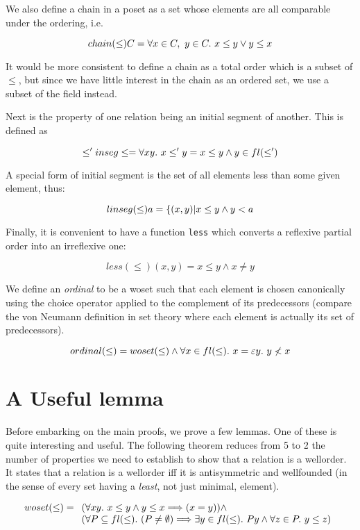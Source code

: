 We also define a chain in a poset as a set whose elements are all comparable
under the ordering, i.e.

$$ chain(\leq) C = \forall x \in C,\ y \in C.\ x \leq y \vee y \leq x $$

It would be more consistent to define a chain as a total order which is a
subset of $\leq$, but since we have little interest in the chain as an ordered
set, we use a subset of the field instead.

Next is the property of one relation being an initial segment of another. This
is defined as

$$ \leq' inseg \leq =
   \forall x y.\ x \leq' y = x \leq y \wedge y \in fl(\leq') $$

A special form of initial segment is the set of all elements less than some
given element, thus:

$$ linseg(\leq) a = \{ (x,y) | x \leq y \wedge y < a $$

Finally, it is convenient to have a function {\tt less} which converts a
reflexive partial order into an irreflexive one:

$$ less(\leq)(x,y) = x \leq y \wedge x \not= y $$

We define an {\em ordinal} to be a woset such that each element is chosen
canonically using the choice operator applied to the complement of its
predecessors (compare the von Neumann definition in set theory where each
element is actually its set of predecessors).

$$ ordinal(\leq) = woset(\leq) \wedge
                   \forall x \in fl(\leq).\ x = \varepsilon y.\ y \not < x $$


\section{A Useful lemma}

Before embarking on the main proofs, we prove a few lemmas. One of these is
quite interesting and useful. The following theorem reduces from 5 to 2 the
number of properties we need to establish to show that a relation is a
wellorder. It states that a relation is a wellorder iff it is antisymmetric and
wellfounded (in the sense of every set having a {\em least}, not just minimal,
element).

$$ woset(\leq) =
 \begin{array}[t]{l} (\forall x y.\ x \leq y \wedge y \leq x \Longrightarrow (x = y)) \wedge     \\
     (\forall P \subseteq fl(\leq).\ (P \not= \emptyset) \Longrightarrow
       \exists y \in fl(\leq).\ P y \wedge \forall z \in P.\ y \leq z)
 \end{array} $$


